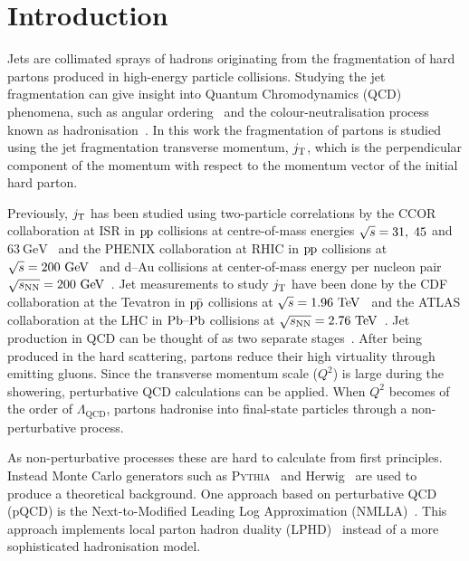 \linenumbers

\section{Introduction}
\label{sec:introduction}
Jets are collimated sprays of hadrons originating from the fragmentation of hard partons produced in high-energy particle collisions. Studying the jet fragmentation can give insight into Quantum Chromodynamics (QCD)~\cite{gross1973ultraviolet, politzer1973reliable, gross1973asymptotically, gross1974asymptotically, georgi1974electroproduction} phenomena, such as angular ordering~\cite{basicsofpqcd} and the colour-neutralisation process known as hadronisation~\cite{introPythia81,herwigManual,herwig7releaseNote}. In this work the fragmentation of partons is studied using the jet fragmentation transverse momentum, $\jt{}$, which is the perpendicular component of the momentum with respect to the momentum vector of the initial hard parton.

Previously, $\jt{}$ has been studied using two-particle correlations by the CCOR collaboration at ISR in $\pp$ collisions at centre-of-mass energies $\sqrtS = 31,\;45$ and $63~\mathrm{GeV}$~\cite{firstjtmeasurement} and the PHENIX collaboration at RHIC in $\pp$ collisions at $\sqrtSE[GeV]{200}$~\cite{PHENIXjets} and d--Au collisions at center-of-mass energy per nucleon pair $\sqrtSnnE[GeV]{200}$~\cite{phenixJtPAu}.
Jet measurements to study $\jt{}$ have been done by the CDF collaboration at the Tevatron in $\ppbar$ collisions at $\sqrtSE{1.96}$~\cite{cdfpaper} and the ATLAS collaboration at the LHC in $\PbPb$ collisions at $\sqrtSnnE{2.76}$~\cite{atlaksenJetit}.
Jet production in QCD can be thought of as two separate stages~\cite{eventGenerators}. After being produced in the hard scattering, partons reduce their high virtuality through emitting gluons. Since the transverse momentum scale ($Q^{2}$) is large during the showering, perturbative QCD calculations can be applied. When $Q^{2}$ becomes of the order of $\Lambda_{\mathrm{QCD}}$, partons hadronise into final-state particles through a non-perturbative process.

As non-perturbative processes these are hard to calculate from first principles. Instead Monte Carlo generators such as \textsc{Pythia}~\cite{introPythia81} and Herwig~\cite{herwig7releaseNote} are used to produce a theoretical background. One approach based on perturbative QCD (pQCD) is the Next-to-Modified Leading Log Approximation (NMLLA)~\cite{nmlla}. This approach implements local parton hadron duality (LPHD)~\cite{Azimov:1984np} instead of a more sophisticated hadronisation model.



